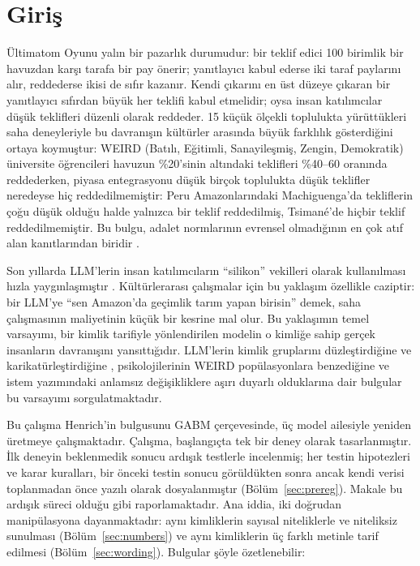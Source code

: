 \documentclass[11pt]{article}
\begin{document}
\section{Giriş}

Ültimatom Oyunu \citep{guth1982} yalın bir pazarlık durumudur: bir teklif edici 100 birimlik bir havuzdan karşı tarafa bir pay önerir; yanıtlayıcı kabul ederse iki taraf paylarını alır, reddederse ikisi de sıfır kazanır. Kendi çıkarını en üst düzeye çıkaran bir yanıtlayıcı sıfırdan büyük her teklifi kabul etmelidir; oysa insan katılımcılar düşük teklifleri düzenli olarak reddeder. \citet{henrich2001} 15 küçük ölçekli toplulukta yürüttükleri saha deneyleriyle bu davranışın kültürler arasında büyük farklılık gösterdiğini ortaya koymuştur: WEIRD (Batılı, Eğitimli, Sanayileşmiş, Zengin, Demokratik) üniversite öğrencileri havuzun \%20'sinin altındaki teklifleri \%40--60 oranında reddederken, piyasa entegrasyonu düşük birçok toplulukta düşük teklifler neredeyse hiç reddedilmemiştir: Peru Amazonlarındaki Machiguenga'da tekliflerin çoğu düşük olduğu halde yalnızca bir teklif reddedilmiş, Tsiman\'e'de hiçbir teklif reddedilmemiştir. Bu bulgu, adalet normlarının evrensel olmadığının en çok atıf alan kanıtlarından biridir \citep{henrich2010}.

Son yıllarda LLM'lerin insan katılımcıların ``silikon'' vekilleri olarak kullanılması hızla yaygınlaşmıştır \citep{argyle2023,horton2023,aher2023,park2023}. Kültürlerarası çalışmalar için bu yaklaşım özellikle caziptir: bir LLM'ye ``sen Amazon'da geçimlik tarım yapan birisin'' demek, saha çalışmasının maliyetinin küçük bir kesrine mal olur. Bu yaklaşımın temel varsayımı, bir kimlik tarifiyle yönlendirilen modelin o kimliğe sahip gerçek insanların davranışını yansıttığıdır. LLM'lerin kimlik gruplarını düzleştirdiğine ve karikatürleştirdiğine \citep{cheng2023compost,wang2025misportray}, psikolojilerinin WEIRD popülasyonlara benzediğine \citep{atari2023which} ve istem yazımındaki anlamsız değişikliklere aşırı duyarlı olduklarına \citep{sclar2024quantifying} dair bulgular bu varsayımı sorgulatmaktadır.

Bu çalışma Henrich'in bulgusunu GABM çerçevesinde, üç model ailesiyle yeniden üretmeye çalışmaktadır. Çalışma, başlangıçta tek bir deney olarak tasarlanmıştır. İlk deneyin beklenmedik sonucu ardışık testlerle incelenmiş; her testin hipotezleri ve karar kuralları, bir önceki testin sonucu görüldükten sonra ancak kendi verisi toplanmadan önce yazılı olarak dosyalanmıştır (Bölüm~\ref{sec:prereg}). Makale bu ardışık süreci olduğu gibi raporlamaktadır. Ana iddia, iki doğrudan manipülasyona dayanmaktadır: aynı kimliklerin sayısal niteliklerle ve niteliksiz sunulması (Bölüm~\ref{sec:numbers}) ve aynı kimliklerin üç farklı metinle tarif edilmesi (Bölüm~\ref{sec:wording}). Bulgular şöyle özetlenebilir:
\end{document}
